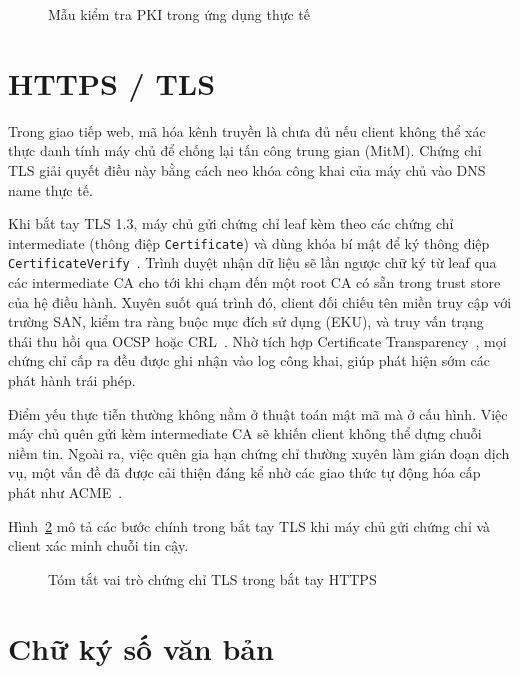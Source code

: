 \begin{figure}[ht]
    \centering
    \caption{Mẫu kiểm tra PKI trong ứng dụng thực tế}
    \label{fig:pki-validation-flow}
\end{figure}

\section{HTTPS / TLS}
\label{sec:5.1}

Trong giao tiếp web, mã hóa kênh truyền là chưa đủ nếu client không thể xác thực danh tính máy chủ để chống lại tấn công trung gian (MitM). Chứng chỉ TLS giải quyết điều này bằng cách neo khóa công khai của máy chủ vào DNS name thực tế. 

Khi bắt tay TLS 1.3, máy chủ gửi chứng chỉ leaf kèm theo các chứng chỉ intermediate (thông điệp \texttt{Certificate}) và dùng khóa bí mật để ký thông điệp \texttt{CertificateVerify}~\cite{RFC8446}. Trình duyệt nhận dữ liệu sẽ lần ngược chữ ký từ leaf qua các intermediate CA cho tới khi chạm đến một root CA có sẵn trong trust store của hệ điều hành. Xuyên suốt quá trình đó, client đối chiếu tên miền truy cập với trường SAN, kiểm tra ràng buộc mục đích sử dụng (EKU), và truy vấn trạng thái thu hồi qua OCSP hoặc CRL~\cite{RFC6960}. Nhờ tích hợp Certificate Transparency~\cite{RFC9162}, mọi chứng chỉ cấp ra đều được ghi nhận vào log công khai, giúp phát hiện sớm các phát hành trái phép.

Điểm yếu thực tiễn thường không nằm ở thuật toán mật mã mà ở cấu hình. Việc máy chủ quên gửi kèm intermediate CA sẽ khiến client không thể dựng chuỗi niềm tin. Ngoài ra, việc quên gia hạn chứng chỉ thường xuyên làm gián đoạn dịch vụ, một vấn đề đã được cải thiện đáng kể nhờ các giao thức tự động hóa cấp phát như ACME~\cite{RFC8555}.

Hình~\ref{fig:tls-handshake} mô tả các bước chính trong bắt tay TLS khi máy chủ gửi chứng chỉ và client xác minh chuỗi tin cậy.

\begin{figure}[htbp]
    \centering
    \caption{Tóm tắt vai trò chứng chỉ TLS trong bắt tay HTTPS}
    \label{fig:tls-handshake}
\end{figure}

\section{Chữ ký số văn bản}
\label{sec:5.2}

